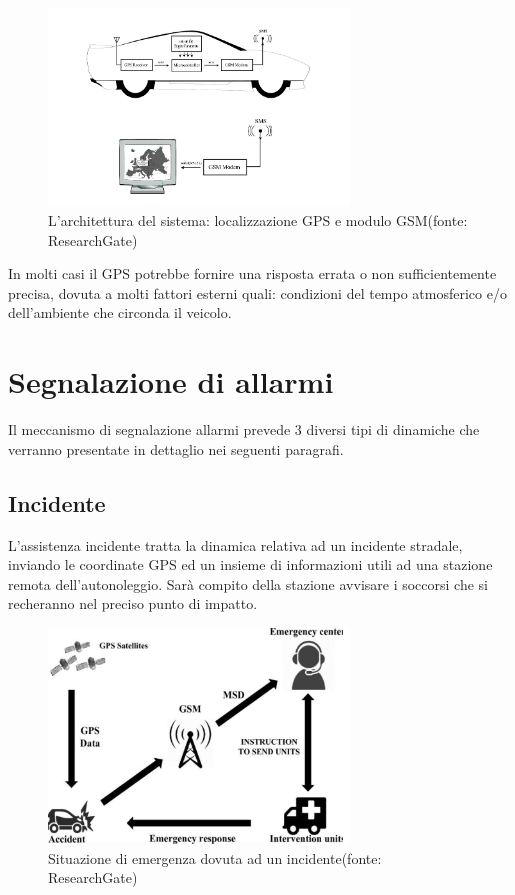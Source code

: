 \documentclass[12pt, a4paper, italian]{report}
\numberwithin{figure}{chapter}
\numberwithin{table}{chapter}
\begin{document}
\begin{figure}[h] \centering
\includegraphics[width=8cm]{tracking.png}
\caption{L'architettura del sistema: localizzazione GPS e modulo GSM\protect\footnotemark (fonte: ResearchGate)}
\label{fig:trackingGPS}
\end{figure}

In molti casi il GPS potrebbe fornire una risposta errata o non sufficientemente precisa, dovuta a molti fattori esterni quali: condizioni del tempo atmosferico e/o dell'ambiente che circonda il veicolo.

\section{Segnalazione di allarmi}
Il meccanismo di segnalazione allarmi prevede 3 diversi tipi di dinamiche che verranno presentate in dettaglio nei seguenti paragrafi. 
\subsection{Incidente}
L'assistenza incidente tratta la dinamica relativa ad un incidente stradale, inviando le coordinate GPS ed un insieme di informazioni utili ad una stazione remota dell'autonoleggio. Sarà compito della stazione avvisare i soccorsi che si recheranno nel preciso punto di impatto. 
\begin{figure}[h] \centering
\includegraphics[width=8cm]{incidente.png}
\caption{Situazione di emergenza dovuta ad un incidente\protect\footnotemark (fonte: ResearchGate)}
\label{fig:emergenzaIncidente}
\end{figure}
\end{document}
